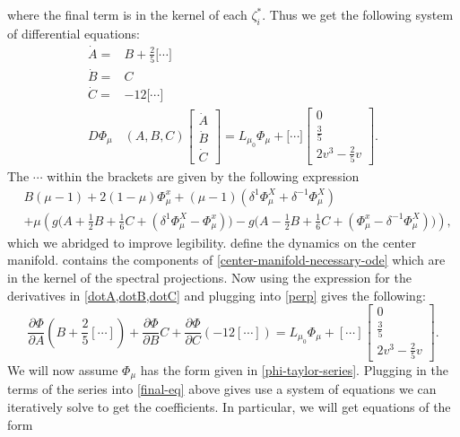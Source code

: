 where the final term is in the kernel of each \(\zeta^*_i\). Thus we get the following system of differential equations:
\begin{align}
	\dot A =& B + \frac 2 5 \Big[ \cdots \Big] \label{dotA}\\
	\dot B =& C \label{dotB}\\
	\dot C =& -12 \Big[\cdots \Big] \label{dotC} \\
	D\Phi_\mu&(A,B,C) \begin{bmatrix} \dot A \\ \dot B \\ \dot C \end{bmatrix} = L_{\mu_0} \Phi_\mu + \Big[ \cdots \Big] \begin{bmatrix} 0 \\ \frac 35 \\ 2v^3 - \frac 2 5 v \end{bmatrix} \label{perp}.
\end{align}
The \(\cdots\) within the brackets are given by the following expression
\begin{equation}\label{ellipses}
\begin{aligned}
	&B (\mu-1) + 2(1-\mu) \Phi_\mu^x + (\mu-1)(\delta^1 \Phi_\mu^X + \delta^{-1} \Phi_\mu^X) \\
	&+  \mu\left( g\big(A + \frac 1 2 B + \frac 1 6 C + (\delta^1 \Phi_\mu^X -\Phi_\mu^x)\big) - g\big(A - \frac 1 2 B + \frac 1 6 C + (\Phi_\mu^x - \delta^{-1} \Phi_\mu^X)\big) \right),
\end{aligned}
\end{equation}
which we abridged to improve legibility.  define the dynamics on the center manifold.  contains the components of \cref{center-manifold-necessary-ode} which are in the kernel of the spectral projections. Now using the expression for the derivatives in \cref{dotA,dotB,dotC} and plugging into \cref{perp} gives the following:
\begin{equation}\label{final-eq}
	\frac{\partial\Phi}{\partial A}\left( B + \frac 2 5 [\cdots]\right) + \frac{\partial\Phi}{\partial B}C + \frac{\partial\Phi}{\partial C}\left(-12 [\cdots]\right) = L_{\mu_0} \Phi_\mu + [\cdots] \begin{bmatrix} 0 \\ \frac 35 \\ 2v^3 - \frac 2 5 v \end{bmatrix}.
\end{equation}
We will now assume \(\Phi_\mu\) has the form given in \cref{phi-taylor-series}. Plugging in the terms of the series into \cref{final-eq} above gives use a system of equations we can iteratively solve to get the coefficients. In particular, we will get equations of the form
